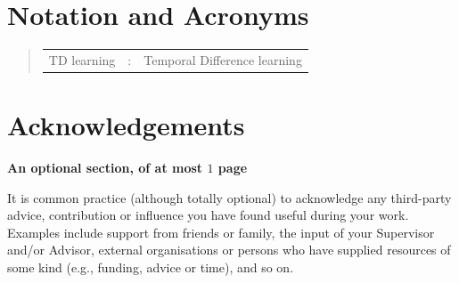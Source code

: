 \documentclass[ %
                    author={Callum Pearce},
                supervisor={Dr. Neill Campbell},
                    degree={MEng},
                     title={How effective are Temporal difference learning methods for reducing the number of zero contribution light paths while still accurately approximating Global Illumination in Path tracing?},
                  subtitle={},
                      type={research},
                      year={2019} ]{dissertation}
\begin{document}

\chapter*{Notation and Acronyms}

\begin{quote}
\noindent
\begin{tabular}{lcl}
TD learning    &:    & Temporal Difference learning\\
\end{tabular}
\end{quote}


\chapter*{Acknowledgements}

{\bf An optional section, of at most $1$ page}
\vspace{1cm} 

\noindent
It is common practice (although totally optional) to acknowledge any
third-party advice, contribution or influence you have found useful
during your work.  Examples include support from friends or family, 
the input of your Supervisor and/or Advisor, external organisations 
or persons who  have supplied resources of some kind (e.g., funding, 
advice or time), and so on.
\end{document}
